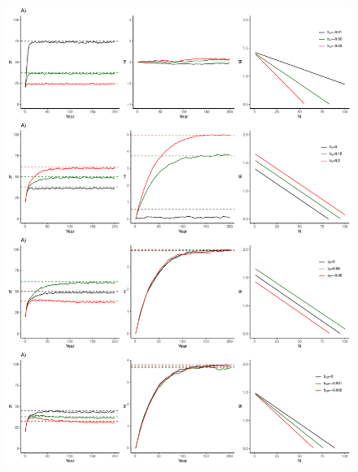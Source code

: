 \documentclass{article}
\begin{document}
\begin{figure}[ht]
	\centering
	\includegraphics[width=12cm, height=16cm]{Figures/Fig3.pdf}

\end{figure}
\end{document}
